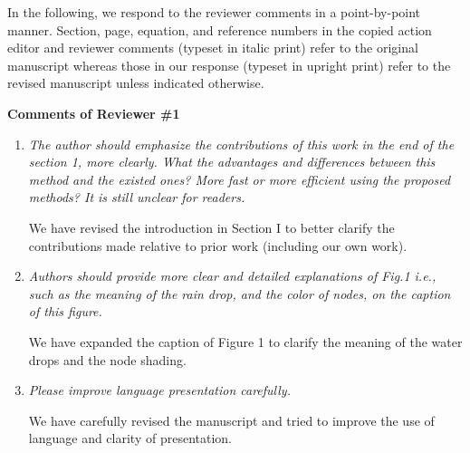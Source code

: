 \documentclass[11pt,onecolumn]{IEEEtran}
\begin{document}
In the following, we respond to the reviewer comments in a point-by-point manner. Section, page, equation, 
and reference numbers in the copied action editor and reviewer comments (typeset in italic print) refer to the 
original manuscript whereas those in our response (typeset in upright print) refer to the revised manuscript 
unless indicated otherwise.

\vspace{5mm}

 

\begin{center}
{\bf\large Comments of Reviewer \#1}
\vspace{1mm}
\end{center}


\begin{enumerate}


\item[1.1] {\em The author should emphasize the contributions of this work in the end of the section 1, more
clearly. What the advantages and differences between this method and the existed ones? More
fast or more efficient using the proposed methods? It is still unclear for readers.
}


\vspace*{2mm}
We have revised the introduction in Section I to better clarify the contributions made 
relative to prior work (including our own work). 
\vspace*{4mm}

\item [1.2] {\em Authors should provide more clear and detailed explanations of Fig.1 i.e., such as the
meaning of the rain drop, and the color of nodes, on the caption of this figure.
}

\vspace*{2mm}
We have expanded the caption of Figure 1 to clarify the meaning of the water drops and 
the node shading. 
\vspace*{4mm}


\item [1.3] {\em  Please improve language presentation carefully.}

\vspace*{2mm}
We have carefully revised the manuscript and tried to improve the use of language and clarity of presentation. 
\vspace*{3mm}






\end{enumerate}
\end{document}
